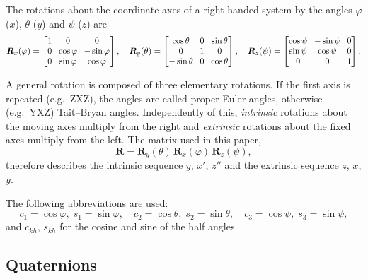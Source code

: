 \documentclass{article}
\theoremstyle{plain}
\theoremstyle{definition}
\newcommand{\vect}[1]{\boldsymbol{#1}}
\begin{document}
The rotations about the coordinate axes of a right-handed system by the angles
$\varphi$ ($x$), $\theta$ ($y$) and $\psi$ ($z$) are
\begin{equation}
  \setlength{\arraycolsep}{4pt}
  \vect R_x(\varphi) = \begin{bmatrix} 1 & 0 & 0 \\ 0 & \cos\varphi & -\sin\varphi \\ 0 & \sin\varphi & \cos\varphi \end{bmatrix},\quad
  \vect R_y(\theta) = \begin{bmatrix} \cos\theta & 0 & \sin\theta \\ 0 & 1 & 0 \\ -\sin\theta & 0 & \cos\theta \end{bmatrix},\quad
  \vect R_z(\psi) = \begin{bmatrix} \cos\psi & -\sin\psi & 0 \\ \sin\psi & \cos\psi & 0 \\ 0 & 0 & 1 \end{bmatrix}.
\end{equation}

A general rotation is composed of three elementary rotations. If the first axis is repeated
(e.g.\ ZXZ), the angles are called proper Euler angles, otherwise (e.g.\ YXZ) Tait--Bryan angles.
Independently of this, \emph{intrinsic} rotations about the moving axes multiply from the right
and \emph{extrinsic} rotations about the fixed axes multiply from the left. The matrix used in
this paper,
\begin{equation}\label{eq:yxz}
  \vect R = \vect R_y(\theta)\, \vect R_x(\varphi)\, \vect R_z(\psi),
\end{equation}
therefore describes the intrinsic sequence $y$, $x'$, $z''$ and the extrinsic sequence $z$, $x$, $y$.

The following abbreviations are used:
\begin{equation}
  c_1 = \cos\varphi,\; s_1 = \sin\varphi,\quad
  c_2 = \cos\theta,\; s_2 = \sin\theta,\quad
  c_3 = \cos\psi,\; s_3 = \sin\psi,
\end{equation}
and $c_{kh}$, $s_{kh}$ for the cosine and sine of the half angles.

\subsection{Quaternions}
\end{document}
